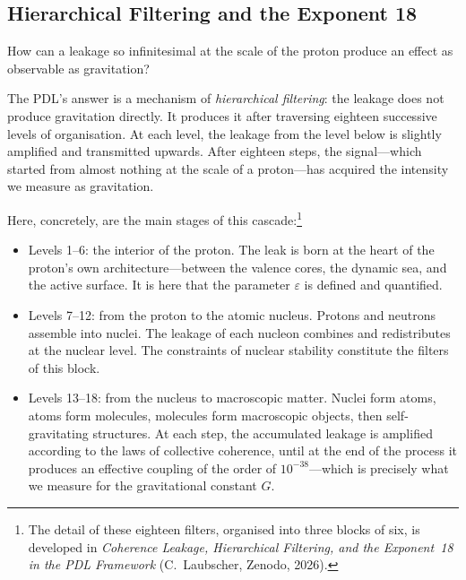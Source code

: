 \documentclass[12pt, a4paper, openright]{book}
\begin{document}
\subsection*{Hierarchical Filtering and the Exponent 18}

How can a leakage so infinitesimal at the scale of the proton produce an effect as observable as gravitation?

The PDL's answer is a mechanism of \emph{hierarchical filtering}: the leakage does not produce gravitation directly. It produces it after traversing eighteen successive levels of organisation. At each level, the leakage from the level below is slightly amplified and transmitted upwards. After eighteen steps, the signal---which started from almost nothing at the scale of a proton---has acquired the intensity we measure as gravitation.

Here, concretely, are the main stages of this cascade:\footnote{The detail of these eighteen filters, organised into three blocks of six, is developed in \textit{Coherence Leakage, Hierarchical Filtering, and the Exponent~18 in the PDL Framework} (C.\ Laubscher, Zenodo, 2026).}

\begin{itemize}
\item Levels 1--6: the interior of the proton. The leak is born at the heart of the proton's own architecture---between the valence cores, the dynamic sea, and the active surface. It is here that the parameter $\varepsilon$ is defined and quantified.
\item Levels 7--12: from the proton to the atomic nucleus. Protons and neutrons assemble into nuclei. The leakage of each nucleon combines and redistributes at the nuclear level. The constraints of nuclear stability constitute the filters of this block.
\item Levels 13--18: from the nucleus to macroscopic matter. Nuclei form atoms, atoms form molecules, molecules form macroscopic objects, then self-gravitating structures. At each step, the accumulated leakage is amplified according to the laws of collective coherence, until at the end of the process it produces an effective coupling of the order of $10^{-38}$---which is precisely what we measure for the gravitational constant $G$.
\end{itemize}

\medskip
\end{document}
